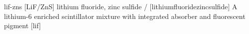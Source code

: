 \newglsXchemical%
{lif-zns}%
[LiF/ZnS]%
{lithium fluoride, zinc sulfide}%
{/}%
[lithiumfluoridezincsulfide]%
{A lithium-6 enriched scintillator mixture with integrated absorber and fluorescent pigment}%
[lif]%